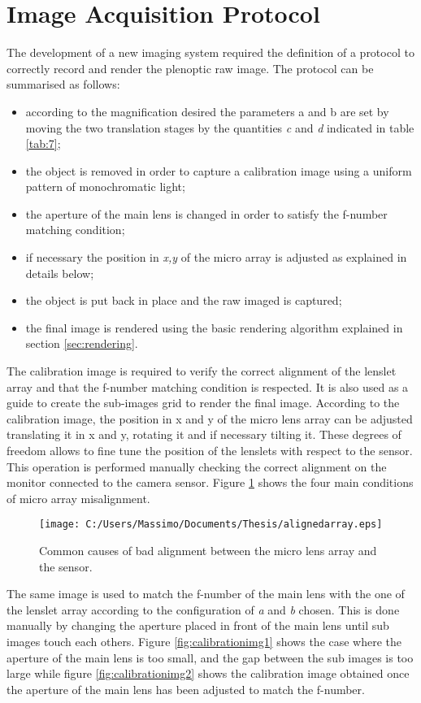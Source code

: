 \section{Image Acquisition Protocol}
\label{sec:protocol}
The development of a new imaging system required the definition of a protocol to correctly record and render the plenoptic raw image. The protocol can be summarised as follows:
\begin{itemize}
	\item according to the magnification desired the parameters a and b are set by moving the two translation stages by the quantities \textit{c} and \textit{d} indicated in table \ref{tab:7};
	\item the object is removed in order to capture a calibration image using a uniform pattern of monochromatic light;
	\item the aperture of the main lens is changed in order to satisfy the f-number matching condition;
	\item if necessary the position in \textit{x,y} of the micro array is adjusted as explained in details below; 
	\item the object is put back in place and the raw imaged is captured;
	\item the final image is rendered using the basic rendering algorithm explained in section \ref{sec:rendering}.
\end{itemize} 
The calibration image is required to verify the correct alignment of the lenslet array and that the f-number matching condition is respected. It is also used as a guide to create the sub-images grid to render the final image. According to the calibration image, the position in x and y of the micro lens array can be adjusted translating it in x and y, rotating it and if necessary tilting it. These degrees of freedom allows to fine tune the position of the lenslets with respect to the sensor. This operation is performed manually checking the correct alignment on the monitor connected to the camera sensor. Figure \ref{fig:calibrationimg3} shows the four main conditions of micro array misalignment.
\begin{figure}[H]
	\centering
	\texttt{[image: C:/Users/Massimo/Documents/Thesis/alignedarray.eps]}
	\caption{\label{fig:calibrationimg3} Common causes of bad alignment between the micro lens array and the sensor. }
\end{figure}
The same image is used to match the f-number of the main lens with the one of the lenslet array according to the configuration of \textit{a} and \textit{b} chosen. This is done manually by changing the aperture placed in front of the main lens until sub images touch each others. Figure \ref{fig:calibrationimg1} shows the case where the aperture of the main lens is too small, and the gap between the sub images is too large while figure \ref{fig:calibrationimg2} shows the calibration image obtained once the aperture of the main lens has been adjusted to match the f-number.
